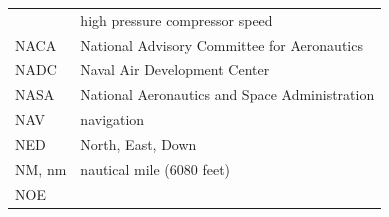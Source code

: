 \documentclass[
]{book}
\begin{document}
\begin{longtable}[]{@{}ll@{}}
\begin{minipage}[t]{0.47\columnwidth}
\end{minipage} & \begin{minipage}[t]{0.47\columnwidth}\raggedright
high pressure compressor speed\strut
\end{minipage}\tabularnewline
\begin{minipage}[t]{0.47\columnwidth}\raggedright
NACA\strut
\end{minipage} & \begin{minipage}[t]{0.47\columnwidth}\raggedright
National Advisory Committee for Aeronautics\strut
\end{minipage}\tabularnewline
\begin{minipage}[t]{0.47\columnwidth}\raggedright
NADC\strut
\end{minipage} & \begin{minipage}[t]{0.47\columnwidth}\raggedright
Naval Air Development Center\strut
\end{minipage}\tabularnewline
\begin{minipage}[t]{0.47\columnwidth}\raggedright
NASA\strut
\end{minipage} & \begin{minipage}[t]{0.47\columnwidth}\raggedright
National Aeronautics and Space Administration\strut
\end{minipage}\tabularnewline
\begin{minipage}[t]{0.47\columnwidth}\raggedright
NAV\strut
\end{minipage} & \begin{minipage}[t]{0.47\columnwidth}\raggedright
navigation\strut
\end{minipage}\tabularnewline
\begin{minipage}[t]{0.47\columnwidth}\raggedright
NED\strut
\end{minipage} & \begin{minipage}[t]{0.47\columnwidth}\raggedright
North, East, Down\strut
\end{minipage}\tabularnewline
\begin{minipage}[t]{0.47\columnwidth}\raggedright
NM, nm\strut
\end{minipage} & \begin{minipage}[t]{0.47\columnwidth}\raggedright
nautical mile (6080 feet)\strut
\end{minipage}\tabularnewline
\begin{minipage}[t]{0.47\columnwidth}\raggedright
NOE\strut
\end{minipage} & \begin{minipage}[t]{0.47\columnwidth}\raggedright

\end{minipage}
\end{longtable}
\end{document}
